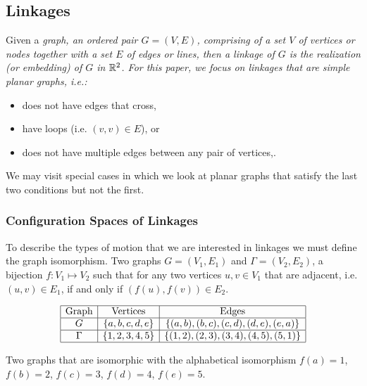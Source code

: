 \subsection{Linkages}
Given a \it{graph}, an ordered pair $G = (V,E)$, comprising of a set $V$ of vertices or nodes together with a set $E$ of edges or lines, then a linkage of $G$ is the realization (or embedding) of $G$ in ${\mathbb{R}}^2$. For this paper, we focus on linkages that are simple planar  graphs, i.e.:
\begin{itemize}
\item[\rn{1}] does not have edges that cross,
\item[\rn{2}] have loops (i.e. $(v,v) \in E$), or
\item[\rn{3}] does not have multiple edges between any pair of vertices,.
\end{itemize}
We may visit special cases in which we look at planar graphs that satisfy the last two conditions but not the first.
\subsubsection{Configuration Spaces of Linkages}
To describe the types of motion that we are interested in linkages we must define the graph isomorphism.  Two graphs $G=(V_1,E_1)$ and $\Gamma = (V_2,E_2) $, a bijection $f: V_1 \mapsto V_2$ such that for any two vertices $u,v \in V_1$ that are adjacent, i.e. $(u, v) \in E_1$, if and only if $(f(u),f(v)) \in E_2$. 
\begin{table}[!ht]
\begin{center}
$$\begin{array}{|c|c|c|}\hline
\text{Graph}&\text{Vertices}&\text{Edges}\\\hline
G&\left\lbrace a,b,c,d,e \right\rbrace & \left\lbrace (a,b),(b,c),(c,d),(d,e),(e,a) \right\rbrace \\\hline
\Gamma&\left\lbrace 1,2,3,4,5 \right\rbrace & \left\lbrace (1,2),(2,3),(3,4),(4,5),(5,1) \right\rbrace \\\hline
\end{array} $$
\caption{Two graphs that are isomorphic with the alphabetical isomorphism $f(a)=1$, $f(b)=2$, $f(c) = 3$, $f(d)=4$, $f(e)=5$.}
\end{center} 
\label{table:linkage-1}
\end{table} 

